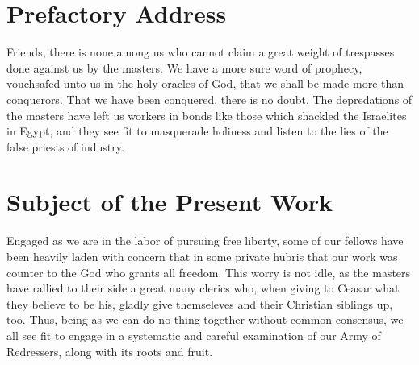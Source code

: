 

\ifdefined\frontmatter
    \frontmatter
\fi

\historicaldeclaration

\section*{Prefactory Address}
Friends, there is none among us who cannot claim a great weight of trespasses done against us by the masters.
We have a more sure word of prophecy, vouchsafed unto us in the holy oracles of God, that we shall be made more than conquerors.
That we have been conquered, there is no doubt.
The depredations of the masters have left us workers in bonds like those which shackled the Israelites in Egypt, and they see fit to masquerade holiness and listen to the lies of the false priests of industry.


\section*{Subject of the Present Work}

Engaged as we are in the labor of pursuing free liberty, some of our fellows have been heavily laden with concern that in some private hubris that our work was counter to the God who grants all freedom.
This worry is not idle, as the masters have rallied to their side a great many clerics who, when giving to Ceasar what they believe to be his, gladly give themseleves and their Christian siblings up, too.
Thus, being as we can do no thing together without common consensus, we all see fit to engage in a systematic and careful examination of our Army of Redressers, along with its roots and fruit.



